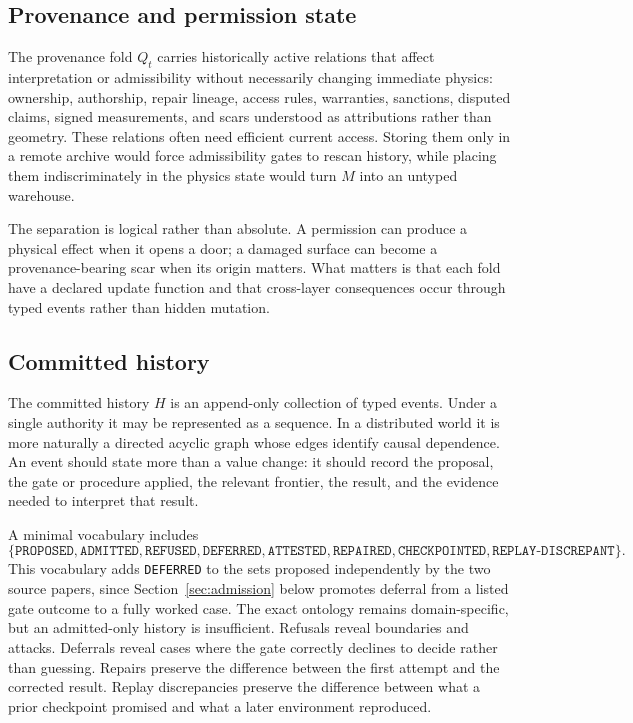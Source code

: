 \documentclass[11pt]{article}
\begin{document}
\subsection{Provenance and permission state}
\label{sec:provenance-state}

The provenance fold $Q_t$ carries historically active relations that affect interpretation or admissibility without necessarily changing immediate physics: ownership, authorship, repair lineage, access rules, warranties, sanctions, disputed claims, signed measurements, and scars understood as attributions rather than geometry. These relations often need efficient current access. Storing them only in a remote archive would force admissibility gates to rescan history, while placing them indiscriminately in the physics state would turn $M$ into an untyped warehouse.

The separation is logical rather than absolute. A permission can produce a physical effect when it opens a door; a damaged surface can become a provenance-bearing scar when its origin matters. What matters is that each fold have a declared update function and that cross-layer consequences occur through typed events rather than hidden mutation.

\subsection{Committed history}
\label{sec:committed-history}

The committed history $H$ is an append-only collection of typed events. Under a single authority it may be represented as a sequence. In a distributed world it is more naturally a directed acyclic graph whose edges identify causal dependence. An event should state more than a value change: it should record the proposal, the gate or procedure applied, the relevant frontier, the result, and the evidence needed to interpret that result.

A minimal vocabulary includes
\[
\{\texttt{PROPOSED}, \texttt{ADMITTED}, \texttt{REFUSED}, \texttt{DEFERRED}, \texttt{ATTESTED}, \texttt{REPAIRED}, \texttt{CHECKPOINTED}, \texttt{REPLAY-DISCREPANT}\}.
\]
This vocabulary adds \texttt{DEFERRED} to the sets proposed independently by the two source papers, since Section~\ref{sec:admission} below promotes deferral from a listed gate outcome to a fully worked case. The exact ontology remains domain-specific, but an admitted-only history is insufficient. Refusals reveal boundaries and attacks. Deferrals reveal cases where the gate correctly declines to decide rather than guessing. Repairs preserve the difference between the first attempt and the corrected result. Replay discrepancies preserve the difference between what a prior checkpoint promised and what a later environment reproduced.
\end{document}
